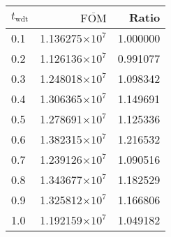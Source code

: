 \begin{tabular}{lrr}
\toprule
$t_{\mathrm{wdt}}$ & $\overline{\mathrm{FOM}}$ &    Ratio \\
\midrule
               0.1 &   1.136275$\times 10^{7}$ & 1.000000 \\
               0.2 &   1.126136$\times 10^{7}$ & 0.991077 \\
               0.3 &   1.248018$\times 10^{7}$ & 1.098342 \\
               0.4 &   1.306365$\times 10^{7}$ & 1.149691 \\
               0.5 &   1.278691$\times 10^{7}$ & 1.125336 \\
               0.6 &   1.382315$\times 10^{7}$ & 1.216532 \\
               0.7 &   1.239126$\times 10^{7}$ & 1.090516 \\
               0.8 &   1.343677$\times 10^{7}$ & 1.182529 \\
               0.9 &   1.325812$\times 10^{7}$ & 1.166806 \\
               1.0 &   1.192159$\times 10^{7}$ & 1.049182 \\
\bottomrule
\end{tabular}
